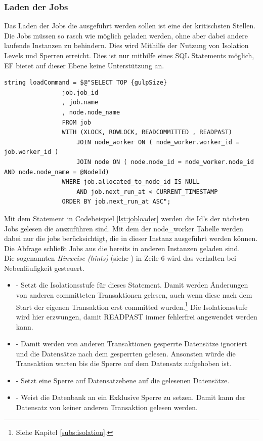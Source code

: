 \subsubsection{Laden der Jobs}
Das Laden der Jobs die ausgeführt werden sollen ist eine der kritischsten Stellen. Die Jobs müssen so rasch wie möglich geladen werden, ohne aber dabei andere laufende Instanzen zu behindern. Dies wird Mithilfe der Nutzung von Isolation Levels und Sperren erreicht. Dies ist nur mithilfe eines SQL Statements möglich, EF bietet auf dieser Ebene keine Unterstützung an.
\begin{lstlisting}[caption={Jobs Laden, siehe DefaultJobLoader.cs - DoLoad()},label={lst:jobloader},captionpos=b]
string loadCommand = $@"SELECT TOP {gulpSize}
				job.job_id
				, job.name
				, node.node_name
				FROM job
				WITH (XLOCK, ROWLOCK, READCOMMITTED , READPAST)
					JOIN node_worker ON ( node_worker.worker_id = job.worker_id )
					JOIN node ON ( node.node_id = node_worker.node_id AND node.node_name = @NodeId)
				WHERE job.allocated_to_node_id IS NULL
					AND job.next_run_at < CURRENT_TIMESTAMP
				ORDER BY job.next_run_at ASC";
\end{lstlisting}
Mit dem Statement in Codebeispiel \ref{lst:jobloader} werden die Id's der nächsten Jobs gelesen die auszuführen sind. Mit dem  der node\_worker Tabelle werden dabei nur die jobs berücksichtigt, die in dieser Instanz ausgeführt werden können. Die Abfrage  schließt Jobs aus die bereits in anderen Instanzen geladen sind. 
\\Die sogenannten \emph{Hinweise (hints)} (siehe \parencite{ms_hints}) in Zeile 6 wird das verhalten bei Nebenläufigkeit gesteuert.
\begin{itemize}
	\item {} - Setzt die Isolationsstufe für dieses Statement. Damit werden Änderungen von anderen committeten Transaktionen gelesen, auch wenn diese nach dem Start der eigenen Transaktion erst committed wurden.\footnote{Siehe Kapitel \ref{subs:isolation}.} Die Isolationsstufe wird hier erzwungen, damit READPAST immer fehlerfrei angewendet werden kann.
	\item {} - Damit werden von anderen Transaktionen gesperrte Datensätze ignoriert und die Datensätze nach dem gesperrten gelesen. Ansonsten würde die Transaktion warten bis die Sperre auf dem Datensatz aufgehoben ist.
	\item {} - Setzt eine Sperre auf Datensatzebene auf die gelesenen Datensätze.
	\item {} - Weist die Datenbank an ein Exklusive Sperre zu setzen. Damit kann der Datensatz von keiner anderen Transaktion gelesen werden.
\end{itemize}
